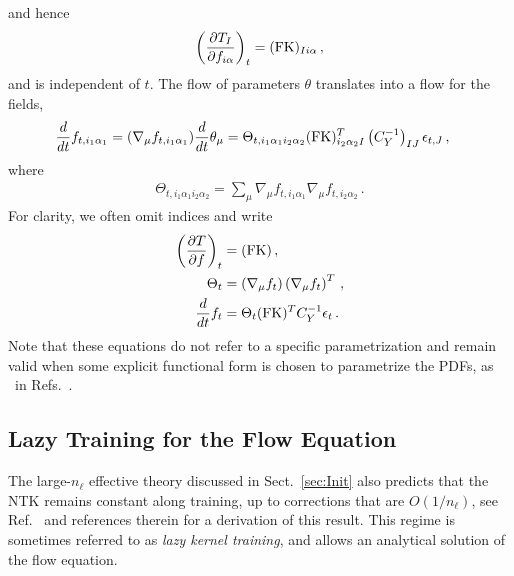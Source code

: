 \documentclass[11pt]{article}
\begin{document}
and hence
\begin{align}
    \label{eq:dTbydf}
    \left(\frac{\partial T_I}{\partial f_{i\alpha}}\right)_t =
        (\mathrm{FK})_{Ii\alpha}\, ,
\end{align}
and is independent of $t$. The flow of parameters $\theta$ translates into a flow for the fields,
\begin{align}
    \label{eq:NTKFlow}
    \frac{d}{dt} &f_{t,i_1\alpha_1} = (\nabla_\mu f_{t,i_1\alpha_1}) \frac{d}{dt} \theta_\mu =
      \Theta_{t,i_1\alpha_1i_2\alpha_2}
      (\mathrm{FK})^T_{i_2\alpha_2I} \left(C_Y^{-1}\right)_{IJ} \epsilon_{t,J}\, ,
\end{align}
where
\begin{align}
    \label{eq:NTKDef}
    \Theta_{t,i_1\alpha_1i_2\alpha_2} = \sum_\mu
    \nabla_\mu f_{t,i_1\alpha_1} \nabla_\mu f_{t,i_2\alpha_2}\, .
\end{align}
For clarity, we often omit indices and write
\begin{align}
    \left(\frac{\partial T}{\partial f}\right)_t
        &= (\mathrm{FK})\, , \\
    \Theta_t
        &= \left(\nabla_\mu f_t\right) \left(\nabla_\mu f_t\right)^T\, , \\
    \label{eq:FlowEquationNoIndices}
    \frac{d}{dt} f_t
        &= \Theta_t (\mathrm{FK})^T C_Y^{-1} \epsilon_t\, .
\end{align}
Note that these equations do not refer to a specific parametrization and remain valid when some
explicit functional form is chosen to parametrize the PDFs, as \eg\ in
Refs.~\cite{Bailey:2020ooq,Hou:2019efy}.

\subsection{Lazy Training for the Flow Equation}
\label{sec:Lazy}

The large-$n_{\ell}$ effective theory discussed in Sect.~\ref{sec:Init} also predicts that
the NTK remains constant along training, up to corrections that are $O(1/n_{\ell})$, see
Ref.~\cite{DBLP:journals/corr/abs-1806-07572} and references therein for a derivation of this result.
This regime is sometimes referred to as {\em lazy kernel training}, and allows an analytical
solution of the flow equation.
\end{document}

